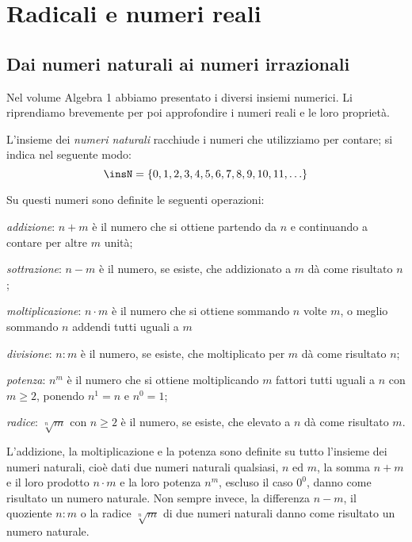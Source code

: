 
\chapter{Radicali e numeri reali}



\section{Dai numeri naturali ai numeri irrazionali}
\label{sec:radicali_irrazionali}
Nel volume Algebra 1 abbiamo presentato i diversi insiemi numerici. Li
riprendiamo brevemente per poi approfondire i numeri reali e le loro
proprietà.

L'insieme dei \emph{numeri naturali} racchiude i numeri che utilizziamo per
contare; si indica nel seguente modo:
\[\insN=\{0,1,2,3,4,5,6,7,8,9,10,11,\ldots\}\]

Su questi numeri sono definite le seguenti operazioni:
\begin{itemize*}
 \item \emph{addizione}: $n+m$ è il numero che si ottiene partendo da $n$ e
  continuando a contare per altre $m$ unità;
 \item \emph{sottrazione}: $n-m$ è il numero, se esiste, che
  addizionato a $m$ dà come risultato $n$;
 \item \emph{moltiplicazione}: $n \cdot m$ è il numero che si ottiene
sommando
  $n$ volte $m$, o meglio sommando $n$ addendi tutti uguali a $m$
 \item \emph{divisione}: $n:m$ è il numero, se esiste, che
  moltiplicato per $m$ dà come risultato $n$;
 \item \emph{potenza}: $n^{m}$ è il numero che si ottiene moltiplicando $m$
  fattori tutti uguali a $n$ con $m \ge 2$, ponendo $n^{1}=n$ e $n^{0}=1$;
 \item \emph{radice}: $\sqrt[{n}]{m}$ con $n\ge 2$ è il numero, se esiste,
  che elevato a $n$ dà come risultato $m$.
\end{itemize*}

L'addizione, la moltiplicazione e la potenza sono definite su tutto
l'insieme dei numeri naturali, cioè dati due numeri naturali qualsiasi, $n$
ed $m$, la somma $n+m$ e il loro prodotto $n \cdot m$ e la loro potenza
$n^{m}$, escluso il caso $0^{0}$, danno come risultato un numero naturale.
Non sempre invece, la differenza $n-m$, il quoziente $n:m$ o la
radice $\sqrt[{n}]{m}$ di due numeri naturali danno come risultato un
numero naturale.


